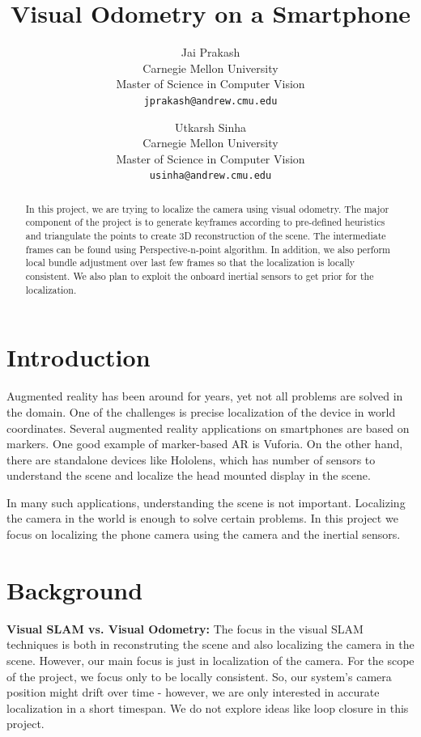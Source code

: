 \documentclass[12pt,twocolumn,letterpaper]{article}
\begin{document}
\title{Visual Odometry on a Smartphone}

\author{Jai Prakash\\
Carnegie Mellon University\\
Master of Science in Computer Vision\\
{\tt\small jprakash@andrew.cmu.edu}
\and
Utkarsh Sinha\\
Carnegie Mellon University\\
Master of Science in Computer Vision\\
{\tt\small usinha@andrew.cmu.edu}
}

\maketitle

\begin{abstract}
In this project, we are trying to localize the camera using visual odometry. The major component of the project is to generate keyframes according to pre-defined heuristics and triangulate the points to create 3D reconstruction of the scene. The intermediate frames can be found using Perspective-n-point algorithm. In addition, we also perform local bundle adjustment over last few frames so that the localization is locally consistent. We also plan to exploit the onboard inertial sensors to get prior for the localization.
\end{abstract}

\section{Introduction}

Augmented reality has been around for years, yet not all problems are solved in the domain. One of the challenges is precise localization of the device in world coordinates. Several augmented reality applications on smartphones are based on markers. One good example of marker-based AR is Vuforia. On the other hand, there are standalone devices like Hololens, which has number of sensors to understand the scene and localize the head mounted display in the scene.

In many such applications, understanding the scene is not important. Localizing the camera in the world is enough to solve certain problems. In this project we focus on localizing the phone camera using the camera and the inertial sensors.

\section{Background}
\textbf{Visual SLAM vs. Visual Odometry: } The focus in the visual SLAM techniques is both in reconstruting the scene and also localizing the camera in the scene. However, our main focus is just in localization of the camera. For the scope of the project, we focus only to be locally consistent. So, our system's camera position might drift over time - however, we are only interested in accurate localization in a short timespan. We do not explore ideas like loop closure in this project.
\end{document}
